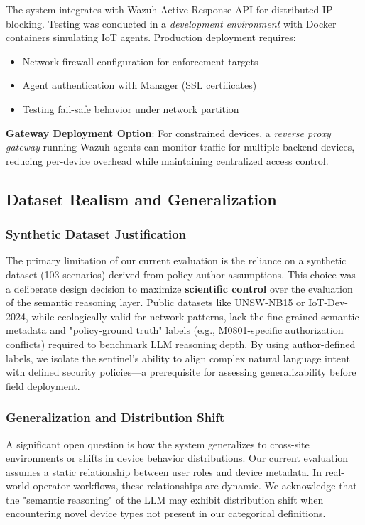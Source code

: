\documentclass[conference]{IEEEtran}
\begin{document}
The system integrates with Wazuh Active Response API for distributed IP blocking. Testing was conducted in a \textit{development environment} with Docker containers simulating IoT agents. Production deployment requires:
\begin{itemize}
    \item Network firewall configuration for enforcement targets
    \item Agent authentication with Manager (SSL certificates)
    \item Testing fail-safe behavior under network partition
\end{itemize}

\textbf{Gateway Deployment Option}: For constrained devices, a \textit{reverse proxy gateway} running Wazuh agents can monitor traffic for multiple backend devices, reducing per-device overhead while maintaining centralized access control.

\subsection{Dataset Realism and Generalization}

\subsubsection{Synthetic Dataset Justification}
The primary limitation of our current evaluation is the reliance on a synthetic dataset (103 scenarios) derived from policy author assumptions. This choice was a deliberate design decision to maximize \textbf{scientific control} over the evaluation of the semantic reasoning layer. Public datasets like UNSW-NB15 or IoT-Dev-2024, while ecologically valid for network patterns, lack the fine-grained semantic metadata and "policy-ground truth" labels (e.g., M0801-specific authorization conflicts) required to benchmark LLM reasoning depth. By using author-defined labels, we isolate the sentinel's ability to align complex natural language intent with defined security policies—a prerequisite for assessing generalizability before field deployment.

\subsubsection{Generalization and Distribution Shift}
A significant open question is how the system generalizes to cross-site environments or shifts in device behavior distributions. Our current evaluation assumes a static relationship between user roles and device metadata. In real-world operator workflows, these relationships are dynamic. We acknowledge that the "semantic reasoning" of the LLM may exhibit distribution shift when encountering novel device types not present in our categorical definitions.
\end{document}
